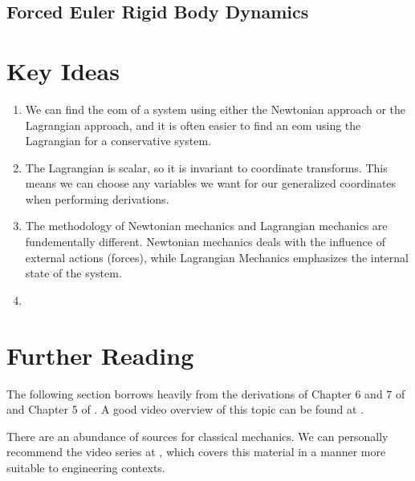 \documentclass[12pt]{report}
\begin{document}
\subsection{Forced Euler Rigid Body Dynamics}
\section{Key Ideas}
\begin{enumerate}
    \item We can find the \gls{eom} of a system using either the Newtonian approach or the \gls{Lagrangian} approach, and it is often easier to find an \gls{eom} using the \gls{Lagrangian} for a \gls{conservative} system.
    \item The \gls{Lagrangian} is scalar, so it is invariant to coordinate transforms. This means we can choose any variables we want for our generalized coordinates when performing derivations.
    \item The methodology of Newtonian mechanics and \gls{Lagrangian} mechanics are fundementally different. Newtonian mechanics deals with the influence of external \glspl{action} (forces), while \gls{Lagrangian} Mechanics emphasizes the internal state of the system.
    \item %
\end{enumerate}
\section{Further Reading}
The following section borrows heavily from the derivations of Chapter 6 and 7 of  \cite{thornton_classical_nodate} and Chapter 5 of  \cite{noauthor_variational_2017}. A good video overview of this topic can be found at \cite{veritasium_closest_2024}.

There are an abundance of sources for classical mechanics. We can personally recommend the video series at \cite{ross_lagranges_nodate}, which covers this material in a manner more suitable to engineering contexts.
\end{document}
